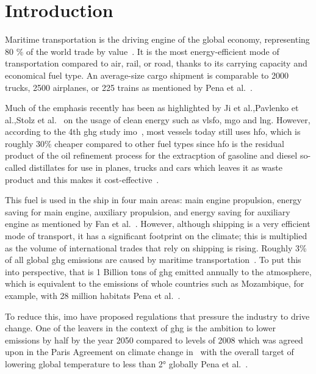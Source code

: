 \section{Introduction}\label{sec:introduction}

Maritime transportation is the driving engine of the global economy, representing 80 \% of the world trade by value~\citep{Unctad2023}. It is the most energy-efficient mode of transportation compared to air, rail, or road, thanks to its carrying capacity and economical fuel type. An average-size cargo shipment is comparable to 2000 trucks, 2500 airplanes, or 225 trains as mentioned by Pena et al.~\citep{penaReviewApplicationsMachine2020}.

Much of the emphasis recently has been as highlighted by Ji et al.,Pavlenko et al.,Stolz et al.~\citep{jiDatadrivenStudyIMO2020, pavlenkoClimateImplicationsUsing, stolzTechnoeconomicAnalysisRenewable2022} on the usage of clean energy such as \ac{vlsfo}, \ac{mgo} and \ac{lng}. 
However, according to the 4th \ac{ghg} study \ac{imo}~\citep{imoFourthIMOGHG2020}, 
most vessels today still uses \ac{hfo}, which is roughly 30\% cheaper compared to other fuel types since \ac{hfo} is the residual product of the oil refinement process for the extracption of gasoline and diesel so-called distillates for use in planes, trucks and cars which leaves it as waste product and this makes it cost-effective~\citep{clearseasMarineFuelsWhat2020}. 

This fuel is used in the ship in four main areas: main engine propulsion, energy saving for main engine, auxiliary propulsion, and energy saving for auxiliary engine as mentioned by Fan et al.~\citep{fanReviewShipFuel}. However, although shipping is a very efficient mode of transport, it has a significant footprint on the climate; this is multiplied as the volume of international trades that rely on shipping is rising. Roughly 3\% of all global \ac{ghg} emissions are caused by maritime transportation~\citep{Unctad2023}. To put this into perspective, that is 1 Billion tons of \ac{ghg} emitted annually to the atmosphere, which is equivalent to the emissions of whole countries such as Mozambique, for example, with 28 million habitats Pena et al.~\citep{penaReviewApplicationsMachine2020}.

To reduce this, \ac{imo} have proposed regulations that pressure the industry to drive change. One of the leavers in the context of \ac{ghg} is the ambition to lower emissions by half by the year 2050 compared to levels of 2008 which was agreed upon in the Paris Agreement on climate change in~\citep{unParisAgreement2015} with the overall target of lowering global temperature to less than 2° globally Pena et al.~\citep{penaReviewApplicationsMachine2020}.

